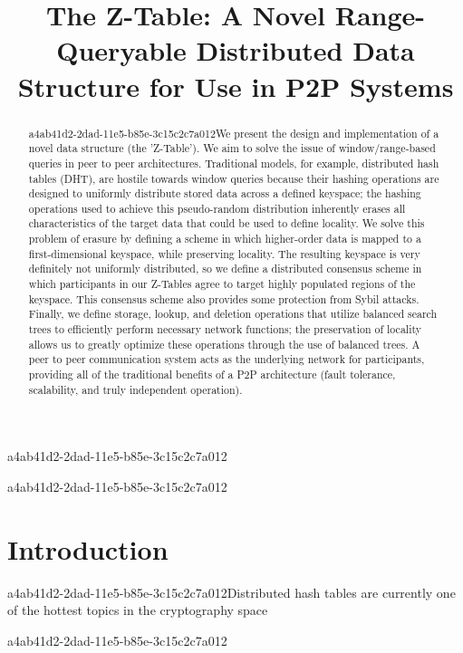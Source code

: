 \documentclass[12pt]{article}
\title{The Z-Table: A Novel Range-Queryable Distributed Data Structure for Use in P2P Systems}
\begin{document}
\maketitle
a4ab41d2-2dad-11e5-b85e-3c15c2c7a012
\begin{abstract}
a4ab41d2-2dad-11e5-b85e-3c15c2c7a012We present the design and implementation of a novel data structure (the 'Z-Table'). We aim to solve the issue of window/range-based queries in peer to peer architectures. Traditional models, for example,  distributed hash tables (DHT), are hostile towards window queries because their hashing operations are designed to uniformly distribute stored data across a defined keyspace; the hashing operations used to achieve this pseudo-random distribution inherently erases all characteristics of the target data that could be used to define locality. We solve this problem of erasure by defining a scheme in which higher-order data is mapped to a first-dimensional keyspace, while preserving locality. The resulting keyspace is very definitely not uniformly distributed, so we define a distributed consensus scheme in which participants in our Z-Tables agree to target highly populated regions of the keyspace. This consensus scheme also provides some protection from Sybil attacks. Finally, we define storage, lookup, and deletion operations that utilize balanced search trees to efficiently perform necessary network functions; the preservation of locality allows us to greatly optimize these operations through the use of balanced trees. A peer to peer communication system acts as the underlying network for participants, providing all of the traditional benefits of a P2P architecture (fault tolerance, scalability, and truly independent operation).
\end{abstract}
a4ab41d2-2dad-11e5-b85e-3c15c2c7a012

\newpage
\section{Introduction}
a4ab41d2-2dad-11e5-b85e-3c15c2c7a012Distributed hash tables are currently one of the hottest topics in the cryptography space~\cite{Stoica:2001dj,Rowstron:2001ea,Ratnasamy:2001wn}

\printbibliography
a4ab41d2-2dad-11e5-b85e-3c15c2c7a012
\end{document}
